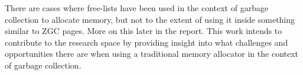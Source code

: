There are cases where free-lists have been used in the context of garbage collection to allocate memory, but not to the extent of using it inside something similar to ZGC pages. More on this later in the report. This work intends to contribute to the research space by providing insight into what challenges and opportunities there are when using a traditional memory allocator in the context of garbage collection.



